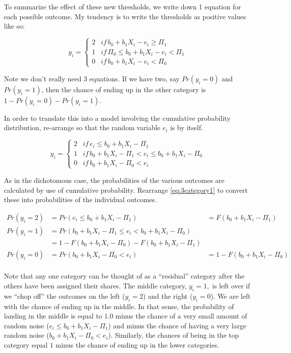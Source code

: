 To summarize the effect of these new thresholds, we write down 1 equation
for each possible outcome. My tendency is to write the thresholds
as positive values like so:

\begin{equation}
y_{i}=\left\{ \begin{array}{lll}
2 & if\,b_{0}+b_{1}X_{i}-e_{i}\geq\Pi_{1}\\
1 & if\,\Pi_{0}\leq b_{0}+b_{1}X_{i}-e_{i}<\Pi_{1}\\
0 & if\,b_{0}+b_{1}X_{i}-e_{i}<\Pi_{0}
\end{array}\right.\label{eq:3category1}
\end{equation}

Note we don't really need 3 equations. If we have two, say $Pr(y_{i}=0)$
and $Pr(y_{i}=1)$, then the chance of ending up in the other category
is $1-Pr(y_{i}=0)-Pr(y_{i}=1)$.

In order to translate this into a model involving the cumulative probability
distribution, re-arrange so that the random variable $e_{i}$ is by
itself.

\begin{equation}
y_{i}=\left\{ \begin{array}{lll}
2 & if\,e_{i}\leq b_{0}+b_{1}X_{i}-\Pi_{1}\\
1 & if\,b_{0}+b_{1}X_{i}-\Pi_{1}<e_{i}\leq b_{0}+b_{1}X_{i}-\Pi_{0}\\
0 & if\,b_{0}+b_{1}X_{i}-\Pi_{0}<e_{i}
\end{array}\right.\label{eq:3category2-1}
\end{equation}

As in the dichotomous case, the probabilities of the various outcomes
are calculated by use of cumulative probability. Rearrange \ref{eq:3category1}
to convert these into probabilities of the individual outcomes.

\begin{equation}
\begin{array}{lll}
Pr(y_{i}=2) & =Pr(e_{i}\leq b_{0}+b_{1}X_{i}-\Pi_{1}) & =F(b_{0}+b_{1}X_{i}-\Pi_{1})\\
Pr(y_{i}=1) & =Pr(b_{0}+b_{1}X_{i}-\Pi_{1}\leq e_{i}<b_{0}+b_{1}X_{i}-\Pi_{0})\\
 & =1-F(b_{0}+b_{1}X_{i}-\Pi_{0})-F(b_{0}+b_{1}X_{i}-\Pi_{1})\\
Pr(y_{i}=0) & =Pr(b_{0}+b_{1}X_{i}-\Pi_{0}<e_{i}) & =1-F(b_{0}+b_{1}X_{i}-\Pi_{0})
\end{array}\label{eq:3category2}
\end{equation}
\\
Note that any one category can be thought of as a ``residual'' category
after the others have been assigned their shares. The middle category,
$y_{i}=1,$ is left over if we ``chop off'' the outcomes on the
left ($y_{i}=2$) and the right ($y_{i}=0$). We are left with the
chance of ending up in the middle. In that sense, the probability
of landing in the middle is equal to $1.0$ minus the chance of a
very small amount of random noise ($e_{i}\leq b_{0}+b_{1}X_{i}-\Pi_{1}$)
and minus the chance of having a very large random noise ($b_{0}+b_{1}X_{i}-\Pi_{0}<e_{i}$).
Similarly, the chances of being in the top category equal $1$ minus
the chance of ending up in the lower categories.

